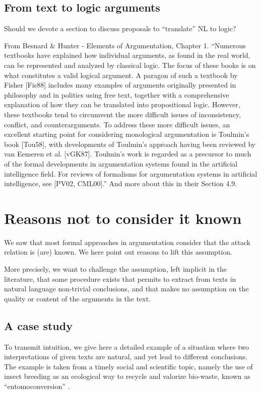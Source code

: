 \documentclass[version=3.21, pagesize, twoside=off, bibliography=totoc, DIV=calc, fontsize=12pt, a4paper, french, english]{scrartcl}
\begin{document}
\subsection{From text to logic arguments}
Should we devote a section to discuss proposals to “translate” NL to logic?

From Besnard \& Hunter - Elements of Argumentation, Chapter 1. “Numerous textbooks have explained how individual arguments, as found in the real world, can be represented and analyzed by classical logic. The focus of these books is on what constitutes a valid logical argument. A paragon of such a textbook by Fisher [Fis88] includes many examples of arguments originally presented in philosophy and in politics using free text, together with a comprehensive explanation of how they can be translated into propositional logic. However, these textbooks tend to circumvent the more difficult issues of inconsistency, conflict, and counterarguments.
To address these more difficult issues, an excellent starting point for considering monological argumentation is Toulmin’s book [Tou58], with developments of Toulmin’s approach having been reviewed by van Eemeren et al. [vGK87]. Toulmin’s work is regarded as a precursor to much of the formal developments in argumentation systems found in the artificial intelligence field. For reviews of formalisms for argumentation systems in artificial intelligence, see [PV02, CML00].” And more about this in their Section 4.9.

\section{Reasons not to consider it known}
We saw that most formal approaches in argumentation consider that the attack relation is (are) known. 
We here point out reasons to lift this assumption.

More precisely, we want to challenge the assumption, left implicit in the literature, that some procedure exists that permits to extract from texts in natural language non-trivial conclusions, and that makes no assumption on the quality or content of the arguments in the text.

\subsection{A case study}
To transmit intuition, we give here a detailed example of a situation where 
two interpretations of given texts are natural, and yet lead to different 
conclusions. The example is taken from a timely social and scientific topic, namely the use of insect breeding as an ecological way to recycle and valorize bio-waste, known as ``entomoconversion'' \citep{FAO2021,Kialo2019}.
\end{document}
